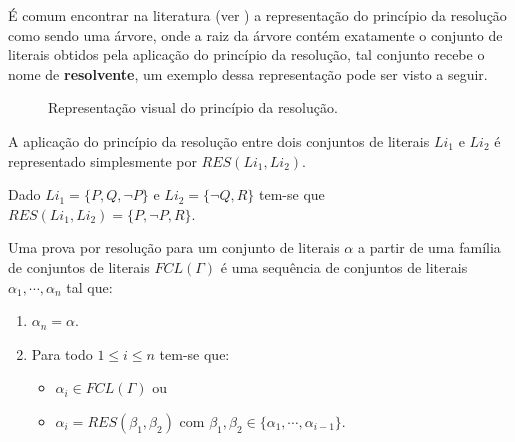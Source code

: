 É comum encontrar na literatura (ver \cite{joaoPavao2014, BenjaV1}) a representação do princípio da resolução como sendo uma árvore, onde a raiz da árvore contém exatamente o conjunto de literais obtidos pela aplicação do princípio da resolução, tal conjunto recebe o nome de \textbf{resolvente}, um exemplo dessa representação pode ser visto a seguir.

\begin{figure}[ht]
    \centering
    \caption{Representação visual do princípio da resolução.}
    \label{fig:PrincipioDaResolucao}
\end{figure}

\begin{rema}
    A aplicação do princípio da resolução entre dois conjuntos de literais $Li_1$ e $Li_2$ é representado simplesmente por $RES(Li_1, Li_2)$.
\end{rema}

\begin{exem}
    Dado $Li_1 = \{P, Q, \neg P\}$ e $Li_2 = \{\neg Q, R\}$ tem-se que $RES(Li_1, Li_2) = \{P, \neg P, R\}$.
\end{exem}

\begin{definition}\label{def:ProvaResolucao}
    Uma prova por resolução para um conjunto de literais $\alpha$ a partir de uma família de conjuntos de literais $FCL(\Gamma)$ é uma sequência de conjuntos de literais $\alpha_1, \cdots, \alpha_n$ tal que:
    \begin{enumerate}
        \item $\alpha_n = \alpha$.
        \item Para todo $1 \leq i \leq n$ tem-se que: 
        \begin{itemize}
            \item $\alpha_i \in FCL(\Gamma)$ ou 
            \item $\alpha_i= RES(\beta_1, \beta_2)$ com $\beta_1, \beta_2 \in \{\alpha_1, \cdots, \alpha_{i-1}\}$.
        \end{itemize}
    \end{enumerate}
\end{definition}


